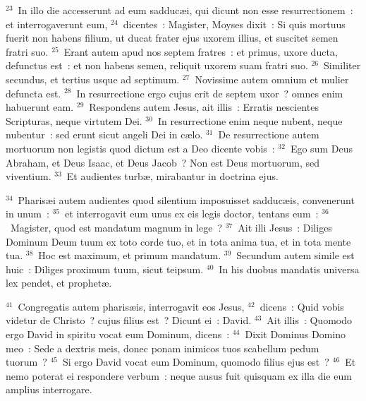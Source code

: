 ${}^{23}$~In illo die accesserunt ad eum sadduc\ae i, qui dicunt non esse resurrectionem~: et interrogaverunt eum,
${}^{24}$~dicentes~: Magister, Moyses dixit~: Si quis mortuus fuerit non habens filium, ut ducat frater ejus uxorem illius, et suscitet semen fratri suo.
${}^{25}$~Erant autem apud nos septem fratres~: et primus, uxore ducta, defunctus est~: et non habens semen, reliquit uxorem suam fratri suo.
${}^{26}$~Similiter secundus, et tertius usque ad septimum.
${}^{27}$~Novissime autem omnium et mulier defuncta est.
${}^{28}$~In resurrectione ergo cujus erit de septem uxor~? omnes enim habuerunt eam.
${}^{29}$~Respondens autem Jesus, ait illis~: Erratis nescientes Scripturas, neque virtutem Dei.
${}^{30}$~In resurrectione enim neque nubent, neque nubentur~: sed erunt sicut angeli Dei in c\ae lo.
${}^{31}$~De resurrectione autem mortuorum non legistis quod dictum est a Deo dicente vobis~:
${}^{32}$~Ego sum Deus Abraham, et Deus Isaac, et Deus Jacob~? Non est Deus mortuorum, sed viventium.
${}^{33}$~Et audientes turb\ae , mirabantur in doctrina ejus.


${}^{34}$~Pharis\ae i autem audientes quod silentium imposuisset sadduc\ae is, convenerunt in unum~:
${}^{35}$~et interrogavit eum unus ex eis legis doctor, tentans eum~:
${}^{36}$~Magister, quod est mandatum magnum in lege~?
${}^{37}$~Ait illi Jesus~: Diliges Dominum Deum tuum ex toto corde tuo, et in tota anima tua, et in tota mente tua.
${}^{38}$~Hoc est maximum, et primum mandatum.
${}^{39}$~Secundum autem simile est huic~: Diliges proximum tuum, sicut teipsum.
${}^{40}$~In his duobus mandatis universa lex pendet, et prophet\ae .


${}^{41}$~Congregatis autem pharis\ae is, interrogavit eos Jesus,
${}^{42}$~dicens~: Quid vobis videtur de Christo~? cujus filius est~? Dicunt ei~: David.
${}^{43}$~Ait illis~: Quomodo ergo David in spiritu vocat eum Dominum, dicens~:
${}^{44}$~Dixit Dominus Domino meo~: Sede a dextris meis, donec ponam inimicos tuos scabellum pedum tuorum~?
${}^{45}$~Si ergo David vocat eum Dominum, quomodo filius ejus est~?
${}^{46}$~Et nemo poterat ei respondere verbum~: neque ausus fuit quisquam ex illa die eum amplius interrogare.

